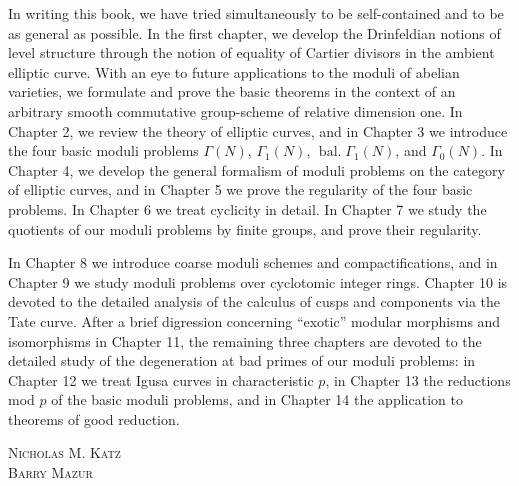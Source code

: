 In writing this book, we have tried simultaneously to be self-contained and to be as general as possible. In the first chapter, we develop the Drinfeldian notions of level structure through the notion of equality of Cartier divisors in the ambient elliptic curve. With an eye to future applications to the moduli of abelian varieties, we formulate and prove the basic theorems in the context of an arbitrary smooth commutative group-scheme of relative dimension one. In Chapter 2, we review the theory of elliptic curves, and in Chapter 3 we introduce the four basic moduli problems $\Gamma(N)$, $\Gamma_1(N)$, $\operatorname{bal.}\Gamma_1(N)$, and $\Gamma_0(N)$. In Chapter 4, we develop the general formalism of moduli problems on the category of elliptic curves, and in Chapter 5 we prove the regularity of the four basic problems. In Chapter 6 we treat cyclicity in detail. In Chapter 7 we study the quotients of our moduli problems by finite groups, and prove their regularity.

In Chapter 8 we introduce coarse moduli schemes and compactifications, and in Chapter 9 we study moduli problems over cyclotomic integer rings. Chapter 10 is devoted to the detailed analysis of the calculus of cusps and components via the Tate curve. After a brief digression concerning ``exotic'' modular morphisms and isomorphisms in Chapter 11, the remaining three chapters are devoted to the detailed study of the degeneration at bad primes of our moduli problems: in Chapter 12 we treat Igusa curves in characteristic $p$, in Chapter 13 the reductions mod $p$ of the basic moduli problems, and in Chapter 14 the application to theorems of good reduction.

\vspace{1.5em}
\begin{flushright}
  \textsc{Nicholas M. Katz}\\
  \textsc{Barry Mazur}
\end{flushright}

\cleardoublepage
